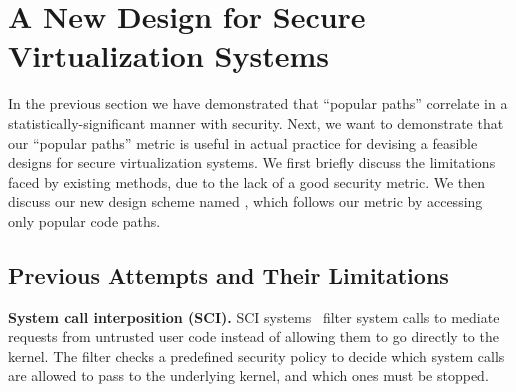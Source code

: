 \section{A New Design for Secure Virtualization Systems}
\label{sec.design}


In the previous section we have demonstrated that ``popular paths'' correlate in
a statistically-significant manner with security.
Next, we want to demonstrate that our ``popular paths'' metric is useful in
actual practice for devising a feasible designs for
secure virtualization systems. We first briefly discuss the limitations faced
by existing methods, due to the lack of a good
security metric. We then discuss our new design scheme named \lip, which follows
our metric by accessing only popular code paths.

\subsection{Previous Attempts and Their Limitations}

\noindent
\textbf{System call interposition (SCI).}
SCI systems~\cite{Janus0:96, Janus:99} filter system calls to mediate requests
from untrusted user code instead of allowing them to go directly to the kernel.
The filter checks a predefined security policy to decide which system calls are
allowed to pass to the underlying kernel, and which ones must be stopped.

